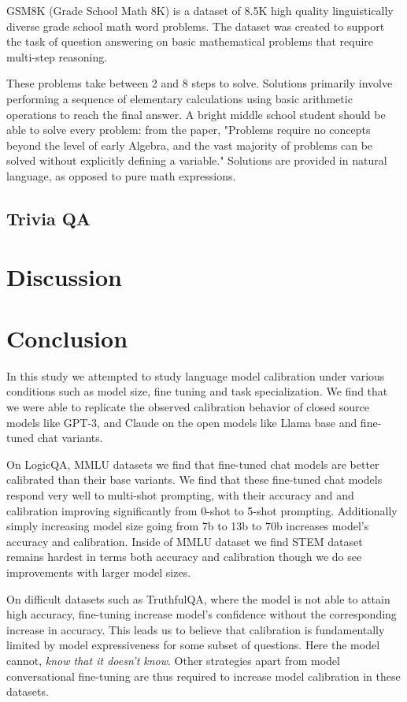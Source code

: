 \documentclass[11pt]{article}
\begin{document}
GSM8K (Grade School Math 8K) is a dataset of 8.5K high quality linguistically diverse grade school math word problems. The dataset was created to support the task of question answering on basic mathematical problems that require multi-step reasoning.

These problems take between 2 and 8 steps to solve. Solutions primarily involve performing a sequence of elementary calculations using basic arithmetic operations  to reach the final answer. A bright middle school student should be able to solve every problem: from the paper, "Problems require no concepts beyond the level of early Algebra, and the vast majority of problems can be solved without explicitly defining a variable." Solutions are provided in natural language, as opposed to pure math expressions. 

\subsection{Trivia QA}



\section{Discussion}




\section{Conclusion}

In this study we attempted to study language model calibration  under various conditions such as model size, fine tuning and task specialization. We find that we were able to replicate the observed  calibration behavior of closed source models like 
GPT-3, and  Claude on the open models like Llama base and fine-tuned chat variants. 

On LogicQA, MMLU datasets we find that fine-tuned chat models are better calibrated than their base variants.
We find that these fine-tuned chat models respond very well to multi-shot prompting, with their accuracy and and calibration improving significantly from 0-shot to 5-shot prompting. Additionally simply increasing 
model size going from 7b to 13b to 70b increases model's accuracy and calibration. Inside of MMLU dataset we find  STEM dataset remains hardest in terms both accuracy and calibration though we do see improvements with larger model sizes.

On difficult datasets such as TruthfulQA, where the 
model is not able to attain high accuracy, fine-tuning 
increase model's confidence without the corresponding 
increase in accuracy. This leads us to believe that 
calibration is fundamentally limited by model 
expressiveness for some subset of questions. Here 
the model cannot, \emph{know that it doesn't know}. Other strategies apart from model conversational 
fine-tuning are thus required to increase model calibration in these datasets.
\end{document}
